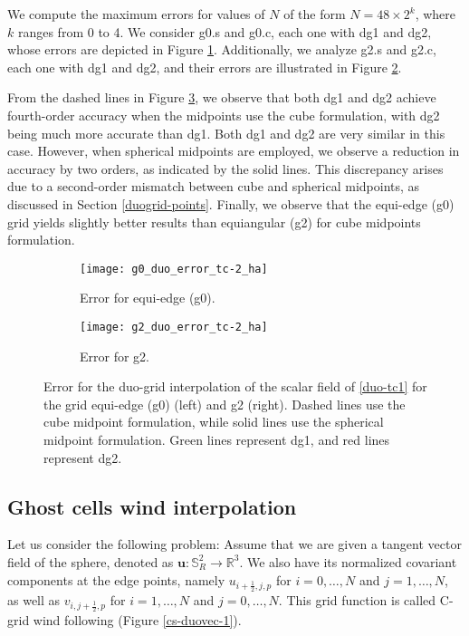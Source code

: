 We compute the maximum errors for values of $N$ of the form $N=48\times2^k$, where $k$ ranges from 0 to 4. 
We consider g0.s and g0.c, each one with dg1 and dg2, whose errors are depicted in Figure \ref{cs-duoscalar-tc1-g0}.
Additionally, we analyze g2.s and g2.c, each one with dg1 and dg2, and their errors are illustrated in Figure \ref{cs-duoscalar-tc1-g2}.

From the dashed lines in Figure \ref{cs-tc1-error}, we observe that both dg1 and dg2 achieve fourth-order accuracy when the midpoints use the cube formulation, 
with dg2 being much more accurate than dg1.
Both dg1 and dg2 are very similar in this case.
However, when spherical midpoints are employed, we observe a reduction in accuracy by two orders, as indicated by the solid lines.
This discrepancy arises due to a second-order mismatch between cube and spherical midpoints, as discussed in Section \ref{duogrid-points}.
Finally, we observe that the equi-edge (g0) grid yields slightly better results than equiangular (g2) for cube midpoints formulation.
\begin{figure}[!htb]
	\centering
	\begin{subfigure}{0.45\textwidth}
		\centering
		\texttt{[image: g0\_duo\_error\_tc-2\_ha]}
		\caption{Error for equi-edge (g0).\label{cs-duoscalar-tc1-g0}}
	\end{subfigure}
	\begin{subfigure}{0.45\textwidth}
		\centering
		\texttt{[image: g2\_duo\_error\_tc-2\_ha]}
		\caption{Error for g2.\label{cs-duoscalar-tc1-g2}}
	\end{subfigure}
	\caption{Error for the duo-grid interpolation of the scalar field of \eqref{duo-tc1} for the grid equi-edge (g0) (left) and g2 (right).
Dashed lines use the cube midpoint formulation, while solid lines use the spherical midpoint formulation.
Green lines represent dg1, and red lines represent dg2.\label{cs-tc1-error}}
\end{figure}


\subsection{Ghost cells wind interpolation}
\label{cs-wind-interp}
Let us consider the following problem: Assume that we are given a tangent vector field of the sphere, denoted as 
$\boldsymbol{u}:\mathbb{S}^2_R \to \mathbb{R}^3$. We also have its normalized covariant components at the edge points, 
namely $u_{i+\frac{1}{2},j,p}$ for $i=0, \ldots, N$ and $j=1, \ldots, N$, as well as
$v_{i,j+\frac{1}{2},p}$ for $i=1, \ldots, N$ and $j=0, \ldots, N$. This grid function is called C-grid wind following \citet{arakawa:1977} (Figure \ref{cs-duovec-1}).

